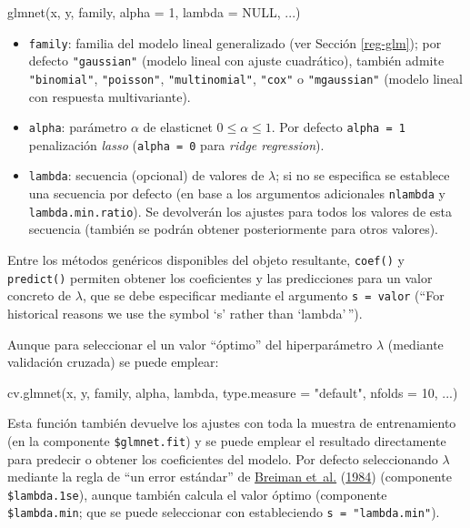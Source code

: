 \documentclass[
  spanish,
]{book}
\newenvironment{Shaded}{\begin{snugshade}}{\end{snugshade}}
\newcommand{\AttributeTok}[1]{\textcolor[rgb]{0.77,0.63,0.00}{#1}}
\newcommand{\ConstantTok}[1]{\textcolor[rgb]{0.00,0.00,0.00}{#1}}
\newcommand{\DecValTok}[1]{\textcolor[rgb]{0.00,0.00,0.81}{#1}}
\newcommand{\FunctionTok}[1]{\textcolor[rgb]{0.00,0.00,0.00}{#1}}
\newcommand{\NormalTok}[1]{#1}
\newcommand{\StringTok}[1]{\textcolor[rgb]{0.31,0.60,0.02}{#1}}
\theoremstyle{break}
\theoremstyle{definition}
\theoremstyle{definition}
\theoremstyle{definition}
\theoremstyle{definition}
\theoremstyle{remark}
\begin{document}
\begin{Shaded}
\begin{Highlighting}[]
\FunctionTok{glmnet}\NormalTok{(x, y, family, }\AttributeTok{alpha =} \DecValTok{1}\NormalTok{, }\AttributeTok{lambda =} \ConstantTok{NULL}\NormalTok{, ...)}
\end{Highlighting}
\end{Shaded}

\begin{itemize}
\item
  \texttt{family}: familia del modelo lineal generalizado (ver Sección \ref{reg-glm}); por defecto \texttt{"gaussian"} (modelo lineal con ajuste cuadrático), también admite \texttt{"binomial"}, \texttt{"poisson"}, \texttt{"multinomial"}, \texttt{"cox"} o \texttt{"mgaussian"} (modelo lineal con respuesta multivariante).
\item
  \texttt{alpha}: parámetro \(\alpha\) de elasticnet \(0 \leq \alpha \leq 1\). Por defecto \texttt{alpha\ =\ 1} penalización \emph{lasso} (\texttt{alpha\ =\ 0} para \emph{ridge regression}).
\item
  \texttt{lambda}: secuencia (opcional) de valores de \(\lambda\); si no se especifica se establece una secuencia por defecto (en base a los argumentos adicionales \texttt{nlambda} y \texttt{lambda.min.ratio}). Se devolverán los ajustes para todos los valores de esta secuencia (también se podrán obtener posteriormente para otros valores).
\end{itemize}

Entre los métodos genéricos disponibles del objeto resultante, \texttt{coef()} y \texttt{predict()} permiten obtener los coeficientes y las predicciones para un valor concreto de \(\lambda\), que se debe especificar mediante el argumento \texttt{s\ =\ valor} (``For historical reasons we use the symbol `s' rather than `lambda'\,'').

Aunque para seleccionar el un valor ``óptimo'' del hiperparámetro \(\lambda\) (mediante validación cruzada) se puede emplear:

\begin{Shaded}
\begin{Highlighting}[]
\FunctionTok{cv.glmnet}\NormalTok{(x, y, family, alpha, lambda, }\AttributeTok{type.measure =} \StringTok{"default"}\NormalTok{, }\AttributeTok{nfolds =} \DecValTok{10}\NormalTok{, ...)}
\end{Highlighting}
\end{Shaded}

Esta función también devuelve los ajustes con toda la muestra de entrenamiento (en la componente \texttt{\$glmnet.fit}) y se puede emplear el resultado directamente para predecir o obtener los coeficientes del modelo.
Por defecto seleccionando \(\lambda\) mediante la regla de ``un error estándar'' de \protect\hyperlink{ref-breiman1984classification}{Breiman et~al.} (\protect\hyperlink{ref-breiman1984classification}{1984}) (componente \texttt{\$lambda.1se}), aunque también calcula el valor óptimo (componente \texttt{\$lambda.min}; que se puede seleccionar con estableciendo \texttt{s\ =\ "lambda.min"}).
\end{document}
